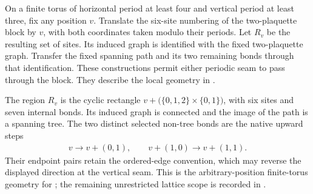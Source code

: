 \begin{definition}%
    \label{def:peps_translated_two_plaquette_geometry}
    \leanok
    On a finite torus of horizontal period at least four and vertical period
    at least three, fix any position $v$. Translate the six-site numbering
    of the two-plaquette block by $v$, with both coordinates taken modulo
    their periods. Let $R_v$ be the resulting set of sites. Its induced graph
    is identified with the fixed two-plaquette graph. Transfer the fixed
    spanning path and its two remaining bonds through that identification.
    These constructions permit either periodic seam to pass through the block.
    They describe the local geometry in
    \cite[Theorem~6.16]{Schuch2010PEPS}.
\end{definition}

\begin{lemma}%
    \label{thm:peps_translated_two_plaquette_geometry}
    \leanok
    The region $R_v$ is the cyclic rectangle
    $v+\bigl(\{0,1,2\}\times\{0,1\}\bigr)$, with six sites and seven internal bonds.
    Its induced graph is connected and the image of the path is a spanning tree.
    The two distinct selected non-tree bonds are the native upward steps
    \begin{align}
        v\longrightarrow v+(0,1),\qquad
        v+(1,0)\longrightarrow v+(1,1).
    \end{align}
    Their endpoint pairs retain the ordered-edge convention, which may
    reverse the displayed direction at the vertical seam.
    This is the arbitrary-position finite-torus geometry for
    \cite[Theorem~6.16]{Schuch2010PEPS}; the remaining unrestricted lattice
    scope is recorded in \cite{gap:rmp_peps_quantum_double_g_isometry}.
\end{lemma}

